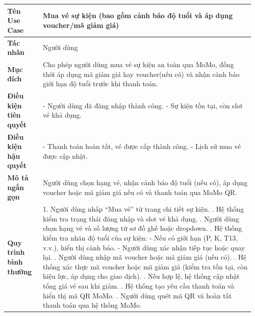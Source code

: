 \begin{table}[H]
\centering
\renewcommand{\arraystretch}{1.3}
\setlength{\tabcolsep}{8pt}
\begin{tabularx}{\textwidth}{|l|X|}
\hline
\textbf{Tên Use Case} & Mua vé sự kiện (bao gồm cảnh báo độ tuổi và áp dụng voucher/mã giảm giá) \\ \hline
\textbf{Tác nhân} & Người dùng \\ \hline
\textbf{Mục đích} & Cho phép người dùng mua vé sự kiện an toàn qua MoMo, đồng thời áp dụng mã giảm giá hay voucher(nếu có) và nhận cảnh báo giới hạn độ tuổi trước khi thanh toán. \\ \hline
\textbf{Điều kiện tiên quyết} &
- Người dùng đã đăng nhập thành công. \newline
- Sự kiện tồn tại, còn slot vé khả dụng. \\ \hline
\textbf{Điều kiện hậu quyết} &
- Thanh toán hoàn tất, vé được cấp thành công. \newline
- Lịch sử mua vé được cập nhật. \\ \hline
\textbf{Mô tả ngắn gọn} &
Người dùng chọn hạng vé, nhận cảnh báo độ tuổi (nếu có), áp dụng voucher hoặc mã giảm giá nếu có và thanh toán qua MoMo QR. \\ \hline
\textbf{Quy trình bình thường} &
1. Người dùng nhấp “Mua vé” từ trang chi tiết sự kiện. \newline
2. Hệ thống kiểm tra trạng thái đăng nhập và slot vé khả dụng. \newline
3. Người dùng chọn hạng vé và số lượng từ sơ đồ ghế hoặc dropdown. \newline
4. Hệ thống kiểm tra nhãn độ tuổi của sự kiện: \newline
\hspace*{1em}- Nếu có giới hạn (P, K, T13, v.v.), hiển thị cảnh báo. \newline
\hspace*{1em}- Người dùng xác nhận tiếp tục hoặc quay lại. \newline
5. Người dùng nhập mã voucher hoặc mã giảm giá (nếu có). \newline
6. Hệ thống xác thực mã voucher hoặc mã giảm giá (kiểm tra tồn tại, còn hiệu lực, áp dụng cho giao dịch). \newline
7. Nếu hợp lệ, hệ thống cập nhật tổng giá vé sau khi giảm. \newline
8. Hệ thống tạo yêu cầu thanh toán và hiển thị mã QR MoMo. \newline
9. Người dùng quét mã QR và hoàn tất thanh toán qua hệ thống MoMo. \newline

\end{tabularx}
\end{table}
